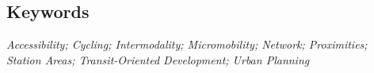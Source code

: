 {%
\subsection*{Keywords}

\noindent
\textsl{Accessibility; Cycling; Intermodality; Micromobility; Network; Proximities; Station Areas; Transit-Oriented Development; Urban Planning}
}